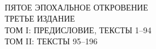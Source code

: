 \begin{center}
\bibcovertitlefont\urantiabook\\[3ex]
\huge{} ПЯТОЕ ЭПОХАЛЬНОЕ ОТКРОВЕНИЕ\\[2ex]
\LARGE{} ТРЕТЬЕ ИЗДАНИЕ\\
\ifmultivol
\Large
\ifvoli ТОМ I: ПРЕДИСЛОВИЕ, ТЕКСТЫ 1--94\\\fi
\ifvolii ТОМ II: ТЕКСТЫ 95--196\\\fi
\fi
{}
\titlesepbig\\
\end{center}

\titleframe

\newpage

